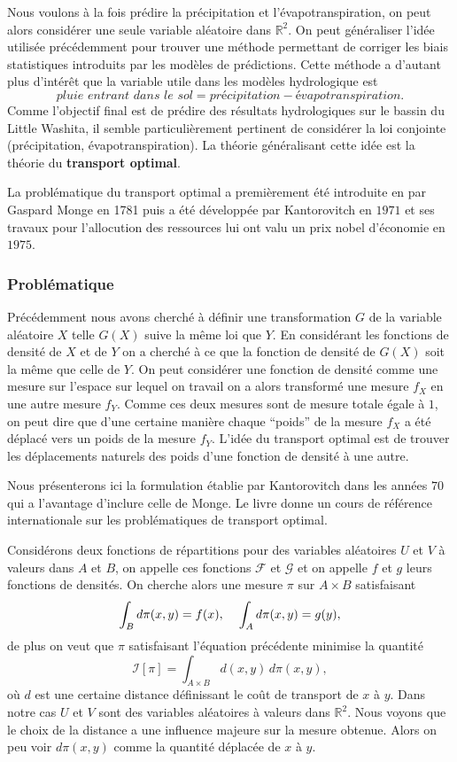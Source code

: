 \documentclass[a4paper,11pt]{article}
\begin{document}
Nous voulons à la fois prédire la précipitation et l'évapotranspiration, on peut alors considérer une seule variable aléatoire dans $\mathbb{R}^2$. On peut généraliser l'idée utilisée précédemment pour trouver une méthode permettant de corriger les biais statistiques introduits par les modèles de prédictions. Cette méthode a d'autant plus d'intérêt que la variable utile dans les modèles hydrologique est 
\[\textit{pluie entrant dans le sol}=\textit{précipitation}-\textit{évapotranspiration}.\]
Comme l'objectif final est de prédire des résultats hydrologiques sur le bassin du Little Washita, il semble particulièrement pertinent de considérer la loi conjointe (précipitation, évapotranspiration). La théorie généralisant cette idée est la théorie du \textbf{transport optimal}.

La problématique du transport optimal a premièrement été introduite en par Gaspard Monge en 1781 puis a été développée par Kantorovitch en $1971$ et ses travaux pour l'allocution des ressources lui ont valu un prix nobel d'économie en $1975$.

\subsubsection{Problématique}

Précédemment nous avons cherché à définir une transformation $G$ de la variable aléatoire $X$ telle $G(X)$ suive la même loi que $Y$. En considérant les fonctions de densité de $X$ et de $Y$ on a cherché à ce que la fonction de densité de $G(X)$ soit la même que celle de $Y$. On peut considérer une fonction de densité comme une mesure sur l'espace sur lequel on travail on a alors transformé une mesure $f_X$ en une autre mesure $f_Y$. Comme ces deux mesures sont de mesure totale égale à $1$, on peut dire que d'une certaine manière chaque ``poids'' de la mesure $f_X$ a été déplacé vers un poids de la mesure $f_Y$. L'idée du transport optimal est de trouver les déplacements naturels des poids d'une fonction de densité à une autre.  

Nous présenterons ici la formulation établie par Kantorovitch dans les années $70$ qui a l'avantage d'inclure celle de Monge. Le livre \cite{villani2003topics} donne un cours de référence internationale sur les problématiques de transport optimal. 

Considérons deux fonctions de répartitions pour des variables aléatoires $U$ et $V$ à valeurs dans $A$ et $B$, on appelle ces fonctions $\mathcal{F}$ et $\mathcal{G}$ et on appelle $f$ et $g$ leurs fonctions de densités. On cherche alors une mesure $\pi$ sur  $A \times B$ satisfaisant
\[\int_{B} d\pi(x,y)= f(x), \hspace{4mm} \int_{A}  d \pi(x,y)= g(y),\]
de plus on veut que $\pi$ satisfaisant l'équation précédente minimise la quantité
\[\mathcal{I}[\pi]=\int_{A \times B}d(x,y) \, d\pi(x,y),\]
où $d$ est une certaine distance définissant le coût de transport de $x$ à $y$. Dans notre cas $U$ et $V$ sont des variables aléatoires à valeurs dans $\mathbb{R}^2$. Nous voyons que le choix de la distance a une influence majeure sur la mesure obtenue. Alors on peu voir $d\pi(x,y)$ comme la quantité déplacée de $x$ à $y$.
\end{document}
